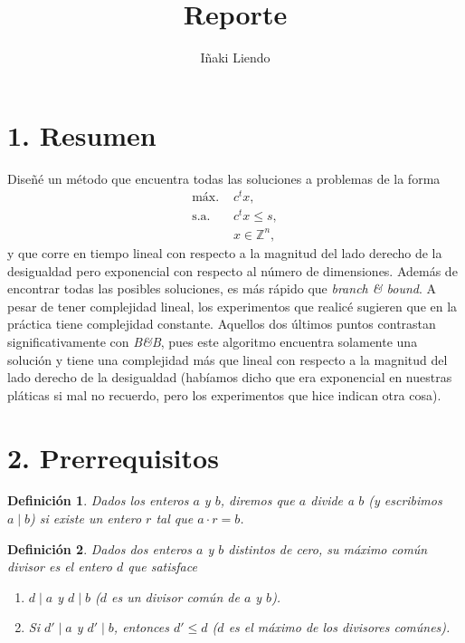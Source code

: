 \documentclass[11pt]{article}
\title{Reporte}
\author{Iñaki Liendo}
\newtheorem{definition}{Definición}
\begin{document}
\maketitle

\section*{1. Resumen}

Diseñé un método que encuentra todas las soluciones a problemas de la forma
\begin{align*}
	\text{máx. } & c^tx, \\
	\text{s.a. } & c^tx \leq s, \\
				 & x \in \mathbb{Z}^n,
\end{align*}
y que corre en tiempo lineal con respecto a la magnitud del lado derecho de la desigualdad pero
exponencial con respecto al número de dimensiones. Además de encontrar todas las posibles
soluciones, es más rápido que \textit{branch \& bound}. A pesar de tener complejidad lineal, los
experimentos que realicé sugieren que en la práctica tiene complejidad constante. Aquellos dos
últimos puntos contrastan significativamente con \textit{B\&B}, pues este algoritmo encuentra
solamente una solución y tiene una complejidad más que lineal con respecto a la magnitud del lado
derecho de la desigualdad (habíamos dicho que era exponencial en nuestras pláticas si mal no
recuerdo, pero los experimentos que hice indican otra cosa).


\section*{2. Prerrequisitos}

\begin{definition}
	Dados los enteros $a$ y $b$, diremos que $a$ divide a $b$ (y escribimos $a \mid b$) si existe un
	entero $r$ tal que $a \cdot r = b$.
\end{definition}

\begin{definition}
	\label{def:gcd}
	Dados dos enteros $a$ y $b$ distintos de cero, su máximo común divisor es el entero $d$ que satisface
	\begin{enumerate}
		\item $d \mid a$ y $d \mid b$ ($d$ es un divisor común de $a$ y $b$).
		\item Si $d' \mid a$ y $d' \mid b$, entonces $d' \leq d$ ($d$ es el máximo de los divisores comúnes).
	\end{enumerate}
\end{definition}
\end{document}
